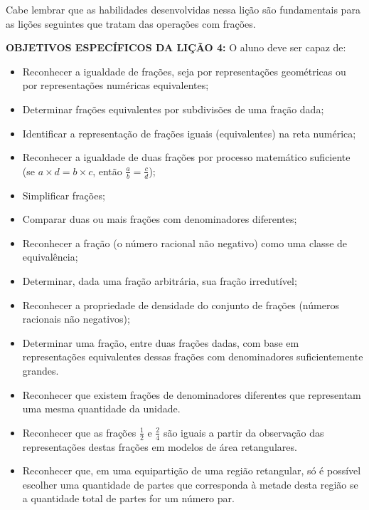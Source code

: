 \begin{multicols}{2}
  Cabe lembrar que as habilidades desenvolvidas nessa lição são fundamentais
para as lições seguintes que tratam das operações com frações.
  \vspace{.15cm}

\noindent \textbf{OBJETIVOS ESPECÍFICOS DA LIÇÃO 4:} O aluno deve ser capaz de:
\vspace{.15cm}

\begin{itemize} %
    \item       Reconhecer a igualdade de frações, seja por representações
geométricas ou por representações numéricas equivalentes;
    \item       Determinar frações equivalentes por subdivisões de uma fração
dada;
    \item       Identificar a representação de frações iguais (equivalentes) na
reta numérica;
    \item       Reconhecer a igualdade de duas frações por processo matemático
suficiente (se       $a \times d = b \times c$, então       $\frac{a}{b} =
\frac{c}{d}$);
    \item       Simplificar frações;
    \item       Comparar duas ou mais frações com denominadores diferentes;
    \item       Reconhecer a fração (o número racional não negativo) como uma
classe de equivalência;
    \item       Determinar, dada uma fração arbitrária, sua fração irredutível;
    \item       Reconhecer a propriedade de densidade do conjunto de frações
(números racionais não negativos);
    \item       Determinar uma fração, entre duas frações dadas, com base em
representações equivalentes dessas frações com denominadores suficientemente
grandes.
\end{itemize} %



\begin{objetivos}[code={\setcounter{tcb@cnt@objetivos}{0}}, label=chap4-ativ1]{}{}
  \begin{itemize} %
    \item Reconhecer que existem frações de denominadores diferentes que representam uma mesma quantidade da unidade.
    \item       Reconhecer que as frações       $\frac{1}{2}$       e
$\frac{2}{4}$       são iguais a partir da observação das representações destas
frações em modelos de área retangulares.
    \item       Reconhecer que, em uma equipartição de uma região retangular, só
é possível escolher uma quantidade de partes que corresponda à metade desta
região se a quantidade total de partes for um número par.


\end{itemize}
\end{objetivos}
\end{multicols}

